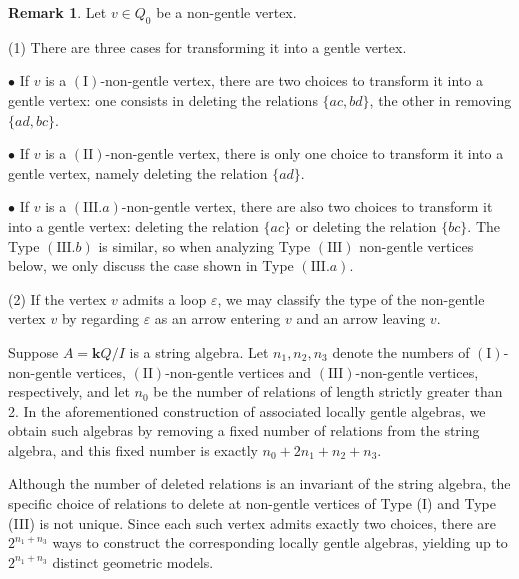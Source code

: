 \documentclass[11pt]{amsart}
\numberwithin{equation}{section}
\theoremstyle{definition}
\newtheorem{remark}[theorem]{Remark}
\begin{document}
\begin{remark}\label{remark:transform non-gentle}
	 Let $v \in Q_{0}$ be  a non-gentle vertex.

  (1) There are three cases for transforming it into a gentle vertex.
	
	 $\bullet$ If $v$ is a $(\mathrm{I})$-non-gentle vertex, there are two choices to transform it into a gentle vertex: one consists in deleting the relations \(\{ac, bd\}\), the other in removing \(\{ad, bc\}\). 
	
	 $\bullet$ If $v$ is a $(\mathrm{II})$-non-gentle vertex, there is only one choice to transform it into a gentle vertex, namely deleting the relation \(\{ad\}\). 
	
	 $\bullet$ If $v$ is a $(\mathrm{III}.a)$-non-gentle vertex, there are also two choices to transform it into a gentle vertex: deleting the relation \(\{ac\}\) or deleting the relation \(\{bc\}\). The Type $(\mathrm{III}.b)$ is similar, so when analyzing Type $(\mathrm{III})$ non-gentle vertices below, we only discuss the case shown in Type $(\mathrm{III}.a)$.
   
    (2) If the vertex $v$ admits a loop $\varepsilon$, we may classify the type of the non-gentle vertex $v$ by regarding $\varepsilon$ as an arrow entering $v$ and an arrow leaving $v$.
 

\end{remark}

Suppose $A=\mathbf{k}Q/I$ is a string algebra. Let $n_1,n_2,n_3$ denote the numbers of $(\mathrm{I})$-non-gentle vertices, $(\mathrm{II})$-non-gentle vertices and $(\mathrm{III})$-non-gentle vertices, respectively, and let $n_0$ be the number of relations of length strictly greater than 2. In the aforementioned construction of associated locally gentle algebras, we obtain such algebras by removing a fixed number of relations from the string algebra, and this fixed number is exactly $n_0+2n_1+n_2+n_3$.

Although the number of deleted relations is an invariant of the string algebra, the specific choice of relations to delete at non-gentle vertices of Type (I) and Type (III) is not unique. Since each such vertex admits exactly two choices, there are $2^{n_1+n_3}$ ways to construct the corresponding locally gentle algebras, yielding up to $2^{n_1+n_3}$ distinct geometric models. 
\end{document}
